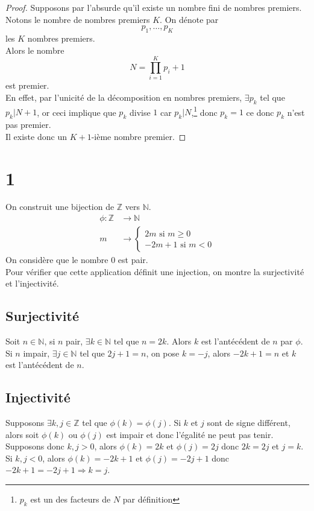 \documentclass[11pt, a4paper]{article}
\begin{document}
\begin{proof}
	Supposons par l'absurde qu'il existe un nombre fini de nombres premiers. Notons le nombre de nombres premiers $K$. On dénote par
	\[ 
	p_1,\ldots,p_K
	\]
	les $K$ nombres premiers.\\
	Alors le nombre
	\[ 
	N=\prod_{i=1} ^{K} p_i + 1
	\]
	est premier.\\
	En effet, par l'unicité de la décomposition en nombres premiers, $\exists p_k$ tel que $p_k | N+1$, or ceci implique que $p_k$ divise $1$ car $p_k | N$,\footnote{$p_k$ est un des facteurs de $N$ par définition} donc $p_k=1$ ce donc $p_k$ n'est pas premier. \\
	Il existe donc un $K+1$-ième nombre premier.
	
\end{proof}
\section*{1}
On construit une bijection de $\mathbb{Z}$ vers $\mathbb{N}$.\\
\begin{align*}
	\phi \colon \mathbb{Z} &\to \mathbb{N}\\
	m & \to 
	\begin{cases}
	2m \text{ si } m \geq 0\\
	-2m +1 \text{ si } m < 0
	\end{cases}
\end{align*}
On considère que le nombre 0 est pair.\\
Pour vérifier que cette application définit une injection, on montre la surjectivité et l'injectivité.\\
\subsection*{Surjectivité}
Soit $n \in \mathbb{N}$, si $n$ pair, $\exists k \in \mathbb{N} \text{ tel que } n = 2k$. Alors $k$ est l'antécédent de $n$ par $\phi$.\\
Si $n$ impair, $\exists j \in \mathbb{N}$ tel que $2j+1=n$, on pose $k=-j$, alors $-2k+1 =n$ et $k$ est l'antécédent de $n$.
\subsection*{Injectivité}
Supposons $\exists k,j \in \mathbb{Z}$ tel que $\phi(k)=\phi(j)$. Si $k$ et $j$ sont de signe différent, alors soit $\phi(k)$ ou $\phi(j)$ est impair et donc l'égalité ne peut pas tenir.\\
Supposons donc $k, j  > 0$, alors $\phi(k) = 2k $ et $\phi(j) = 2j$ donc $2k=2j$ et $j=k$.\\
Si $k, j <0 $, alors $\phi(k) = -2k + 1$ et $\phi(j) = -2j +1$ donc $-2k+1 = -2j + 1 \Rightarrow k =j$.	\\
\end{document}
